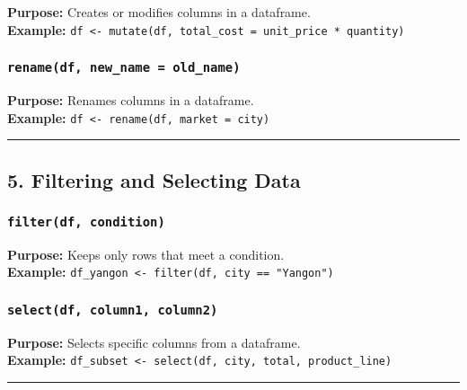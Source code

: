 \documentclass[
  11pt,
]{article}
\begin{document}
\textbf{Purpose:} Creates or modifies columns in a dataframe.\\
\textbf{Example:}
\texttt{df\ \textless{}-\ mutate(df,\ total\_cost\ =\ unit\_price\ *\ quantity)}

\subsubsection{\texorpdfstring{\textbf{\texttt{rename(df,\ new\_name\ =\ old\_name)}}}{rename(df, new\_name = old\_name)}}\label{renamedf-new_name-old_name}

\textbf{Purpose:} Renames columns in a dataframe.\\
\textbf{Example:}
\texttt{df\ \textless{}-\ rename(df,\ market\ =\ city)}

\begin{center}\rule{0.5\linewidth}{0.5pt}\end{center}

\subsection{\texorpdfstring{\textbf{5. Filtering and Selecting
Data}}{5. Filtering and Selecting Data}}\label{filtering-and-selecting-data}

\subsubsection{\texorpdfstring{\textbf{\texttt{filter(df,\ condition)}}}{filter(df, condition)}}\label{filterdf-condition}

\textbf{Purpose:} Keeps only rows that meet a condition.\\
\textbf{Example:}
\texttt{df\_yangon\ \textless{}-\ filter(df,\ city\ ==\ "Yangon")}

\subsubsection{\texorpdfstring{\textbf{\texttt{select(df,\ column1,\ column2)}}}{select(df, column1, column2)}}\label{selectdf-column1-column2}

\textbf{Purpose:} Selects specific columns from a dataframe.\\
\textbf{Example:}
\texttt{df\_subset\ \textless{}-\ select(df,\ city,\ total,\ product\_line)}

\begin{center}\rule{0.5\linewidth}{0.5pt}\end{center}
\end{document}
